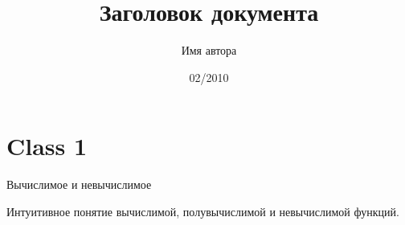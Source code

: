 \documentclass[a4paper,12pt]{article}
\title{Заголовок документа}
\author{Имя автора}
\date{02/2010}
\begin{document}

\maketitle %

\section*{Class 1}{Вычислимое и невычислимое}

Интуитивное понятие вычислимой, полувычислимой и невычислимой функций.
\end{document}
